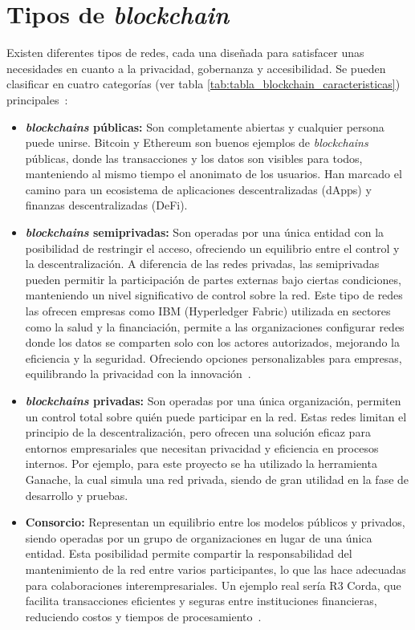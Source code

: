 \section{Tipos de \textit{blockchain}}

Existen diferentes tipos de redes, cada una diseñada para satisfacer unas necesidades en cuanto a la privacidad, gobernanza y accesibilidad. 
Se pueden clasificar en cuatro categorías (ver tabla \ref{tab:tabla_blockchain_caracteristicas}) principales~\cite{introducciónBlockchain}:

\begin{itemize}
\item \textbf{\textit{blockchains} públicas:} Son completamente abiertas y cualquier persona puede unirse. Bitcoin y Ethereum son buenos ejemplos de \textit{blockchains} públicas, donde las transacciones y los datos son visibles para todos, manteniendo al mismo tiempo el anonimato de los usuarios. Han marcado el camino para un ecosistema de aplicaciones descentralizadas (dApps) y finanzas descentralizadas (DeFi).

\item \textbf{\textit{blockchains} semiprivadas:} Son operadas por una única entidad con la posibilidad de restringir el acceso, ofreciendo un equilibrio entre el control y la descentralización. A diferencia de las redes privadas, las semiprivadas pueden permitir la participación de partes externas bajo ciertas condiciones, manteniendo un nivel significativo de control sobre la red.
Este tipo de redes las ofrecen empresas como IBM (Hyperledger Fabric) utilizada en sectores como la salud y la financiación, permite a las organizaciones configurar redes donde los datos se comparten solo con los actores autorizados, mejorando la eficiencia y la seguridad. Ofreciendo opciones personalizables para empresas, equilibrando la privacidad con la innovación~\cite{Hyperledger}.

\item \textbf{\textit{blockchains} privadas:} Son operadas por una única organización, permiten un control total sobre quién puede participar en la red. Estas redes limitan el principio de la descentralización, pero ofrecen una solución eficaz para entornos empresariales que necesitan privacidad y eficiencia en procesos internos.
Por ejemplo, para este proyecto se ha utilizado la herramienta Ganache, la cual simula una red privada, siendo de gran utilidad en la fase de desarrollo y pruebas.

\item \textbf{Consorcio:} Representan un equilibrio entre los modelos públicos y privados, siendo operadas por un grupo de organizaciones en lugar de una única entidad. Esta posibilidad permite compartir la responsabilidad del mantenimiento de la red entre varios participantes, lo que las hace adecuadas para colaboraciones interempresariales. 
Un ejemplo real sería R3 Corda, que facilita transacciones eficientes y seguras entre instituciones financieras, reduciendo costos y tiempos de procesamiento~\cite{R3Corda}.

\end{itemize} 


